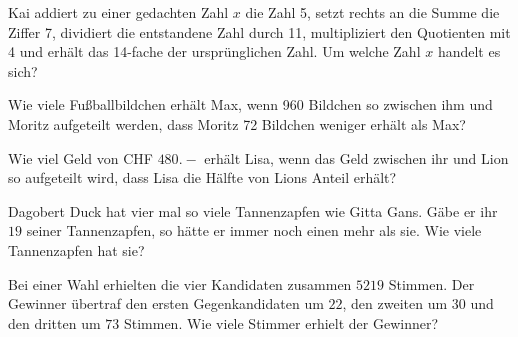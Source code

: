 \begin{bbwAufgabenBlock}
\item
Kai addiert zu einer gedachten Zahl $x$ die Zahl 5, setzt rechts an die
Summe die Ziffer 7, dividiert die entstandene Zahl durch 11,
multipliziert den Quotienten mit 4 und erhält das 14-fache der
ursprünglichen Zahl. Um welche Zahl $x$ handelt es sich?



\item Wie viele Fußballbildchen erhält Max, wenn 960 Bildchen so
zwischen ihm und Moritz aufgeteilt werden, dass Moritz 72 Bildchen
weniger erhält als Max?



\item Wie viel Geld von CHF $480.-$ erhält Lisa, wenn das Geld
zwischen ihr und Lion so aufgeteilt wird, dass Lisa die Hälfte von
Lions Anteil erhält?


\item Dagobert Duck hat vier mal so viele Tannenzapfen wie Gitta
Gans. Gäbe er ihr $19$ seiner Tannenzapfen, so hätte er immer noch einen
mehr als sie. Wie viele Tannenzapfen hat sie?


\noTRAINER{\newpage}

\item Bei einer Wahl erhielten die vier Kandidaten zusammen $5219$
Stimmen. Der Gewinner übertraf den ersten Gegenkandidaten um $22$, den
zweiten um $30$ und den dritten um $73$ Stimmen. Wie viele Stimmer erhielt
der Gewinner?


\end{bbwAufgabenBlock}
